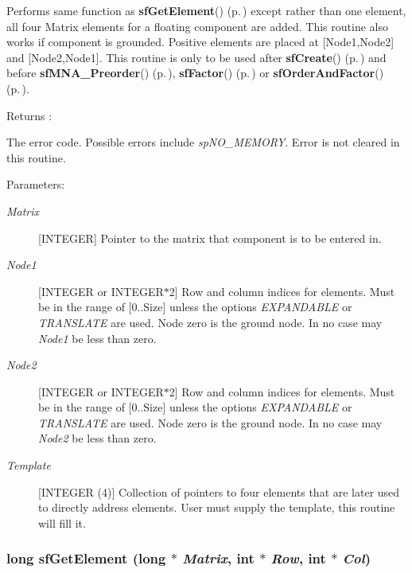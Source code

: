 Performs same function as {\bf sf\-Get\-Element}() {\rm (p.\,\pageref{spFortran_8c_a51})} except rather than one element, all four Matrix elements for a floating component are added. This routine also works if component is grounded. Positive elements are placed at [Node1,Node2] and [Node2,Node1]. This routine is only to be used after {\bf sf\-Create}() {\rm (p.\,\pageref{spFortran_8c_a47})} and before {\bf sf\-MNA\_\-Preorder}() {\rm (p.\,\pageref{spFortran_8c_a70})}, {\bf sf\-Factor}() {\rm (p.\,\pageref{spFortran_8c_a62})} or {\bf sf\-Order\-And\-Factor}() {\rm (p.\,\pageref{spFortran_8c_a61})}.

\begin{Desc}
\item[Returns :]\par
[INTEGER or INTEGER$\ast$2] The error code. Possible errors include {\em sp\-NO\_\-MEMORY}. Error is not cleared in this routine.\end{Desc}
\begin{Desc}
\item[Parameters: ]\par
\begin{description}
\item[{\em 
Matrix}][INTEGER] Pointer to the matrix that component is to be entered in. \item[{\em 
Node1}][INTEGER or INTEGER$\ast$2] Row and column indices for elements. Must be in the range of [0..Size] unless the options {\em EXPANDABLE} or {\em TRANSLATE} are used. Node zero is the ground node. In no case may {\em Node1} be less than zero. \item[{\em 
Node2}][INTEGER or INTEGER$\ast$2] Row and column indices for elements. Must be in the range of [0..Size] unless the options {\em EXPANDABLE} or {\em TRANSLATE} are used. Node zero is the ground node. In no case may {\em Node2} be less than zero. \item[{\em 
Template}][INTEGER (4)] Collection of pointers to four elements that are later used to directly address elements. User must supply the template, this routine will fill it. \end{description}
\end{Desc}
\subsubsection{\setlength{\rightskip}{0pt plus 5cm}long sf\-Get\-Element (long $\ast$ {\em Matrix}, int $\ast$ {\em Row}, int $\ast$ {\em Col})}\label{spFortran_8c_a51}


